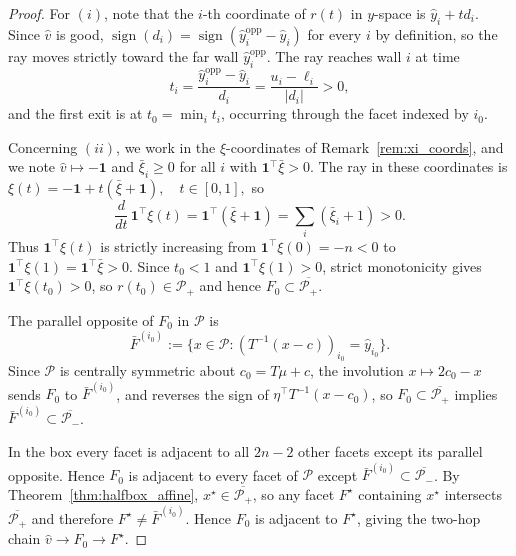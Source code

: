 \documentclass[pdflatex,sn-mathphys-num]{sn-jnl}%
\theoremstyle{thmstyleone}%
\theoremstyle{thmstyletwo}%
\theoremstyle{thmstylethree}%
\theoremstyle{thmstylethree}%
\begin{document}
\begin{proof}
For $(i)$, note that the $i$-th coordinate of $r(t)$ in $y$-space is $\hat{y}_i+td_i$.
Since $\hat{v}$ is good, $\operatorname{sign}(d_i)=\operatorname{sign}(\hat{y}^{\mathrm{opp}}_i-\hat{y}_i)$ for every $i$ by definition, so the ray moves strictly toward the far wall $\hat{y}^{\mathrm{opp}}_i$.
The ray reaches wall $i$ at time
\[
  t_i = \frac{\hat{y}^{\mathrm{opp}}_i - \hat{y}_i}{d_i} = \frac{u_i-\ell_i}{|d_i|} > 0,
\]
and the first exit is at $t_0=\min_i t_i$, occurring through the facet indexed by $i_0$.

\noindent Concerning $(ii)$, 
we work in the $\xi$-coordinates of Remark~\ref{rem:xi_coords}, and we note $\hat{v}\mapsto-\mathbf{1}$ and
$\bar{\xi}_i\ge 0$ for all $i$ with $\mathbf{1}^\top\bar{\xi}>0$.
The ray in these coordinates is $\xi(t) = -\mathbf{1}+t(\bar{\xi}+\mathbf{1}), \quad t\in[0,1],
$
so
\[
  \frac{d}{dt}\,\mathbf{1}^\top\xi(t)
  = \mathbf{1}^\top(\bar{\xi}+\mathbf{1})
  = \sum_i(\bar{\xi}_i+1) > 0.
\]
Thus $\mathbf{1}^\top\xi(t)$ is strictly increasing from
$\mathbf{1}^\top\xi(0)=-n<0$ to $\mathbf{1}^\top\xi(1)=\mathbf{1}^\top\bar{\xi}>0$.
Since $t_0<1$ and
$\mathbf{1}^\top\xi(1)>0$, strict monotonicity gives
$\mathbf{1}^\top\xi(t_0)>0$, so $r(t_0)\in\mathcal{P}_+$ and hence
$F_0\subset\overline{\mathcal{P}_+}$.

\noindent The parallel opposite of $F_0$ in $\mathcal{P}$ is
\[
  \bar{F}^{(i_0)} := \bigl\{x\in\mathcal{P}:(T^{-1}(x-c))_{i_0}=\hat{y}_{i_0}\bigr\}.
\]
Since $\mathcal{P}$ is centrally symmetric about $c_0=T\mu+c$, the involution
$x\mapsto 2c_0-x$ sends $F_0$ to $\bar{F}^{(i_0)}$, and reverses the sign of
$\eta^\top T^{-1}(x-c_0)$, so $F_0\subset\overline{\mathcal{P}_+}$ implies
$\bar{F}^{(i_0)}\subset\overline{\mathcal{P}_-}$.

\noindent In the box every facet is adjacent to all $2n-2$ other facets
except its parallel opposite. Hence $F_0$ is adjacent to every facet of
$\mathcal{P}$ except $\bar{F}^{(i_0)}\subset\overline{\mathcal{P}_-}$.
By Theorem~\ref{thm:halfbox_affine}, $x^\star\in\overline{\mathcal{P}_+}$,
so any facet $F^\star$ containing $x^\star$ intersects $\overline{\mathcal{P}_+}$
and therefore $F^\star\ne\bar{F}^{(i_0)}$.
Hence $F_0$ is adjacent to $F^\star$, giving the two-hop chain
$\hat{v}\to F_0\to F^\star$.
\end{proof}


\end{document}
